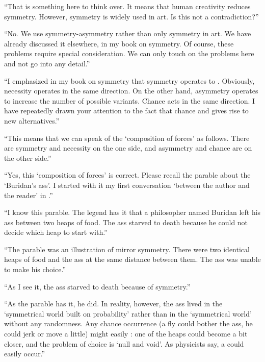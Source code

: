 \begin{dialogue}
\rdr ``That is something here to think over. It means that human
creativity reduces symmetry. However, symmetry is widely used in art.
Is this not a contradiction?''

\athr ``No. We use symmetry-asymmetry rather than only
symmetry in art. We have already discussed it elsewhere, in my book
on symmetry. Of course, these problems require special consideration.
We can only touch on the problems here and not go into any detail.''

``I emphasized in my book on symmetry that symmetry operates to
. Obviously, necessity operates in the same direction. On the other hand, asymmetry operates to increase the number of possible variants. Chance acts in the same direction. I have repeatedly drawn your
attention to the fact that chance  and gives rise to new alternatives.''

\rdr ``This means that we can speak of the `composition of forces'
as follows. There are symmetry and necessity on the one side, and
asymmetry and chance are on the other side.''

\athr ``Yes, this `composition of forces' is correct. Please recall the
parable about the `Buridan's ass'. I started with it my first
conversation `between the author and the reader' in .''

\rdr ``I know this parable. The legend has it that a philosopher
named Buridan left his ass between two heaps of food. The ass
starved to death because he could not decide which heap to start
with.''

\athr ``The parable was an illustration of mirror symmetry. There
were two identical heaps of food and the ass at the same distance
between them. The ass was unable to make his choice.''

\rdr ``As I see it, the ass starved to death because of symmetry.''

\athr ``As the parable has it, he did. In reality, however, the ass
lived in the `symmetrical world built on probability' rather than in the
`symmetrical world' without any randomness. Any chance occurrence
(a fly could bother the ass, he could jerk or move a little) might easily
: one of the heaps could become a bit closer, and the problem of choice is `null and void'. As physicists say,
a  could easily occur.''


\end{dialogue}
